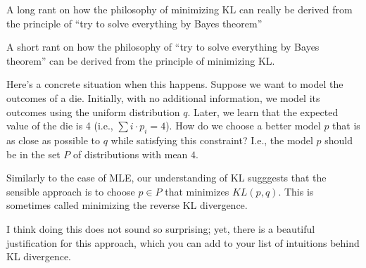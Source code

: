 \documentclass{article}
\begin{document}
A long rant on how the philosophy of minimizing KL can really be derived from the principle of ``try to solve everything by Bayes theorem''

A short rant on how the philosophy of ``try to solve everything by Bayes theorem'' can be derived from the principle of minimizing KL.  




Here's a concrete situation when this happens. 
Suppose we want to model the outcomes of a die. Initially, with no additional information, we model its outcomes using the uniform distribution \(q\). 
Later, we learn that the expected value of the die is 4 (i.e., \(\sum i\cdot p_i = 4\)). How do we choose a better model \(p\) that is as close as possible to \(q\) while satisfying this constraint? I.e., the model $p$ should be in the set $P$ of distributions with mean $4$. 

Similarly to the case of MLE, our understanding of KL sugggests that the sensible approach is to choose \(p \in P\) that minimizes \(KL(p,q)\). This is sometimes called minimizing the reverse KL divergence. 

I think doing this does not sound so surprising; yet, there is a beautiful justification for this approach, which you can add to your list of intuitions behind KL divergence. 




\end{document}
